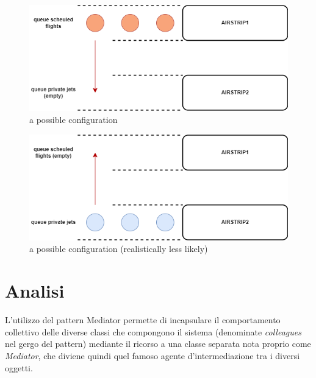 \documentclass{article}
\begin{document}
\begin{sloppy}
\bigbreak



\begin{figure}[H]
    \centering
    \includegraphics[scale=0.5]{figure2.png}
    \caption{a possible configuration}
    \label{fig:enter-label}
\end{figure}


\bigbreak


\begin{figure}[H]
    \centering
    \includegraphics[scale=0.5]{figure3.png}
    \caption{a possible configuration (realistically less likely)}
    \label{fig:enter-label}
\end{figure}

\section{Analisi}
L'utilizzo del pattern Mediator permette di incapsulare il comportamento collettivo delle diverse classi che compongono il sistema (denominate \textit{colleagues} nel gergo del pattern) mediante il ricorso a una classe separata nota proprio come \textit{Mediator}, che diviene quindi quel famoso agente d'intermediazione tra i diversi oggetti.

\bigbreak


\end{sloppy}
\end{document}
